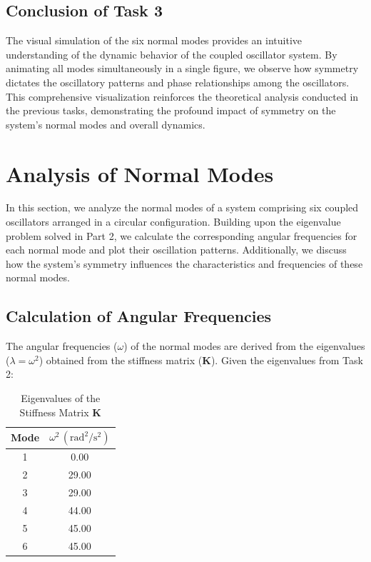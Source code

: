 \documentclass[12pt]{report} %
\begin{document}
\subsection{Conclusion of Task 3}
\label{subsec:part2_task3_conclusion}

The visual simulation of the six normal modes provides an intuitive understanding of the dynamic behavior of the coupled oscillator system. By animating all modes simultaneously in a single figure, we observe how symmetry dictates the oscillatory patterns and phase relationships among the oscillators. This comprehensive visualization reinforces the theoretical analysis conducted in the previous tasks, demonstrating the profound impact of symmetry on the system's normal modes and overall dynamics.

\newpage



\section{Analysis of Normal Modes}
\label{sec:part4}

In this section, we analyze the normal modes of a system comprising six coupled oscillators arranged in a circular configuration. Building upon the eigenvalue problem solved in Part 2, we calculate the corresponding angular frequencies for each normal mode and plot their oscillation patterns. Additionally, we discuss how the system's symmetry influences the characteristics and frequencies of these normal modes.

\subsection{Calculation of Angular Frequencies}
\label{subsec:part4_angular_frequencies}

The angular frequencies (\( \omega \)) of the normal modes are derived from the eigenvalues (\( \lambda = \omega^2 \)) obtained from the stiffness matrix (\( \mathbf{K} \)). Given the eigenvalues from Task 2:

\begin{table}[h]
    \centering
    \caption{Eigenvalues of the Stiffness Matrix \( \mathbf{K} \)}
    \label{tab:eigenvalues_part4}
    \begin{tabular}{|c|c|}
        \hline
        \textbf{Mode} & \(\omega^2 \, (\text{rad}^2/\text{s}^2)\) \\
        \hline
        1 & 0.00 \\
        2 & 29.00 \\
        3 & 29.00 \\
        4 & 44.00 \\
        5 & 45.00 \\
        6 & 45.00 \\
        \hline
    \end{tabular}
\end{table}
\end{document}

